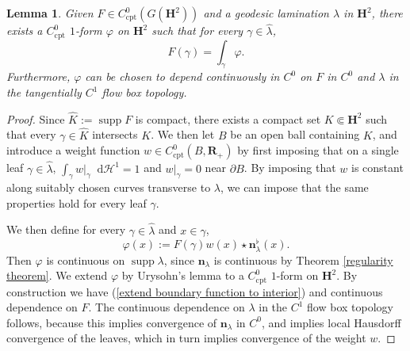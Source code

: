 \documentclass[reqno,11pt]{amsart}
\newcommand{\RR}{\mathbf{R}}
\newcommand{\Hyp}{\mathbf H}
\newcommand*\dif{\mathop{}\!\mathrm{d}}
\DeclareMathOperator{\supp}{supp}
\newcommand{\normal}{\mathbf n}
\newcommand{\cpt}{\mathrm{cpt}}
\newtheorem{lemma}[theorem]{Lemma}
\theoremstyle{definition}
\numberwithin{equation}{section}
\begin{document}
\begin{lemma}
Given $F \in C^0_\cpt(G(\Hyp^2))$ and a geodesic lamination $\lambda$ in $\Hyp^2$, there exists a $C^0_\cpt$ $1$-form $\varphi$ on $\Hyp^2$ such that for every $\gamma \in \hat \lambda$,
\begin{equation}\label{extend boundary function to interior}
F(\gamma) = \int_\gamma \varphi.
\end{equation}
Furthermore, $\varphi$ can be chosen to depend continuously in $C^0$ on $F$ in $C^0$ and $\lambda$ in the tangentially $C^1$ flow box topology.
\end{lemma}
\begin{proof}
Since $\hat K := \supp F$ is compact, there exists a compact set $K \Subset \Hyp^2$ such that every $\gamma \in \hat K$ intersects $K$.
We then let $B$ be an open ball containing $K$, and introduce a weight function $w \in C^0_\cpt(B, \RR_+)$ by first imposing that on a single leaf $\gamma \in \hat \lambda$, $\int_\gamma w|_\gamma \dif \mathcal H^1 = 1$ and $w|_\gamma = 0$ near $\partial B$.
By imposing that $w$ is constant along suitably chosen curves transverse to $\lambda$, we can impose that the same properties hold for every leaf $\gamma$.

We then define for every $\gamma \in \hat \lambda$ and $x \in \gamma$,
$$\varphi(x) := F(\gamma) w(x) \star \normal_\lambda^\flat(x).$$
Then $\varphi$ is continuous on $\supp \lambda$, since $\normal_\lambda$ is continuous by Theorem \ref{regularity theorem}.
We extend $\varphi$ by Urysohn's lemma to a $C^0_\cpt$ $1$-form on $\Hyp^2$.
By construction we have (\ref{extend boundary function to interior}) and continuous dependence on $F$.
The continuous dependence on $\lambda$ in the $C^1$ flow box topology follows, because this implies convergence of $\normal_\lambda$ in $C^0$, and implies local Hausdorff convergence of the leaves, which in turn implies convergence of the weight $w$.
\end{proof}
\end{document}
